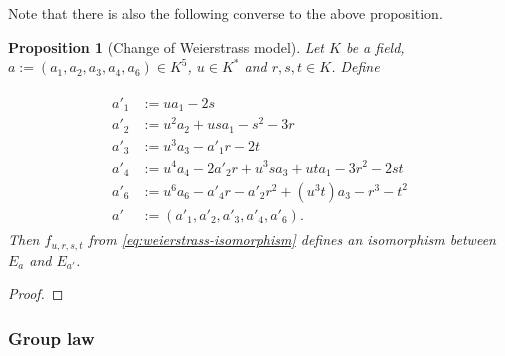 \documentclass[a4paper,12pt,reqno]{amsart}
\newtheorem{proposition}[lemma]{Proposition}
\theoremstyle{definition}
\numberwithin{lemma}{section}
\numberwithin{equation}{section}
\numberwithin{figure}{section}
\begin{document}
Note that there is also the following converse to the above proposition.
\begin{proposition}[Change of Weierstrass model]\label{stmt:urst-is-iso-between-weierstrass-over-K-is}
Let $K$ be a field,  $a := (a_1,a_2,a_3,a_4,a_6) \in K^5$, $u \in K^*$ and $r,s,t \in K$. Define 
\begin{comment}
the raw unsimplyfied stuff
\begin{align*} 
a'_1 & := a_1u -2s \\
a'_2 & := a_2u^2 + a_1us - s^2 -3r\\ 
a'_3 & := a_3u^3 - a_1ur + 2rs -2t \\
a'_4 & := a_4u^4 + a_3u^3s -2a_2u^2r -2a_1urs + 2rs^2 + 3r^2 + a_1ut + -2st \\
a'_6 & := a_{6} u^{6} - a_{4} u^{4} r - a_{3} u^{3} r s + a_{2} u^{2} r^{2} + a_{1} u r^{2} s - r^{2} s^{2} + a_{3} u^{3} t - r^{3} -a_{1} u r t + 2 r s t - t^{2}
\end{align*} 
\end{comment}
\begin{align}
\begin{split}
a'_1 &:= u a_{1} - 2 s \\
a'_2 &:= u^{2} a_{2} + u s a_{1} - s^{2} - 3 r \\
a'_3 &:= u^{3} a_{3} - a'_1 r - 2 t \\
a'_4 &:= u^{4} a_{4} - 2 a'_2 r + u^{3} s a_{3} + u t a_{1} - 3 r^{2} - 2 s t \\
a'_6 &:= u^{6} a_{6} - a'_4 r - a'_2 r^2 + \left(u^{3} t\right) a_{3} - r^{3} - t^{2}\\
a' &:= (a'_1,a'_2,a'_3,a'_4,a'_6).
\end{split}
\end{align}
Then $f_{u,r,s,t}$ from \cref{eq:weierstrass-isomorphism} defines an isomorphism between $E_a$ and $E_{a'}$. 

\end{proposition}
\begin{proof}
\end{proof}
\subsubsection{Group law}
\end{document}
